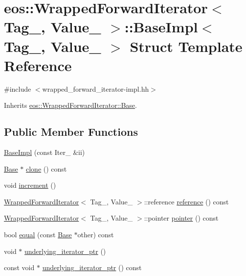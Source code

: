 \hypertarget{structeos_1_1WrappedForwardIterator_1_1BaseImpl}{
\section{eos::WrappedForwardIterator$<$ Tag\_\-, Value\_\- $>$::BaseImpl$<$ Tag\_\-, Value\_\- $>$ Struct Template Reference}
\label{structeos_1_1WrappedForwardIterator_1_1BaseImpl}
}


{\ttfamily \#include $<$wrapped\_\-forward\_\-iterator-\/impl.hh$>$}

Inherits \hyperlink{structeos_1_1WrappedForwardIterator_1_1Base}{eos::WrappedForwardIterator::Base}.\subsection*{Public Member Functions}
\begin{DoxyCompactItemize}
\item 
\hyperlink{structeos_1_1WrappedForwardIterator_1_1BaseImpl_ace18b4460fe774ada155046312de5ad6}{BaseImpl} (const Iter\_\- \&ii)
\item 
\hyperlink{structeos_1_1WrappedForwardIterator_1_1Base}{Base} $\ast$ \hyperlink{structeos_1_1WrappedForwardIterator_1_1BaseImpl_afe3d32be8e6bd2788db24f89e90ceef9}{clone} () const 
\item 
void \hyperlink{structeos_1_1WrappedForwardIterator_1_1BaseImpl_ac6565ae3236b5b128d671a1011f9c9ee}{increment} ()
\item 
\hyperlink{classeos_1_1WrappedForwardIterator}{WrappedForwardIterator}$<$ Tag\_\-, Value\_\- $>$::reference \hyperlink{structeos_1_1WrappedForwardIterator_1_1BaseImpl_a61c99fb9827d32e094355f8c152e65f0}{reference} () const 
\item 
\hyperlink{classeos_1_1WrappedForwardIterator}{WrappedForwardIterator}$<$ Tag\_\-, Value\_\- $>$::pointer \hyperlink{structeos_1_1WrappedForwardIterator_1_1BaseImpl_ad11775ce759f6aa3eff84e67b5e859fd}{pointer} () const 
\item 
bool \hyperlink{structeos_1_1WrappedForwardIterator_1_1BaseImpl_a07f6ef7a9f4c21de044aca1d09aed9f7}{equal} (const \hyperlink{structeos_1_1WrappedForwardIterator_1_1Base}{Base} $\ast$other) const 
\item 
void $\ast$ \hyperlink{structeos_1_1WrappedForwardIterator_1_1BaseImpl_aab9c324066b8488f0f84395de5b02dfc}{underlying\_\-iterator\_\-ptr} ()
\item 
const void $\ast$ \hyperlink{structeos_1_1WrappedForwardIterator_1_1BaseImpl_aae9d385a45b3ddddab20aec8e9f49fe8}{underlying\_\-iterator\_\-ptr} () const 
\end{DoxyCompactItemize}

